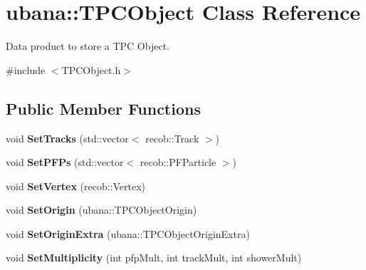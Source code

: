 \hypertarget{classubana_1_1TPCObject}{\section{ubana\-:\-:T\-P\-C\-Object Class Reference}
\label{classubana_1_1TPCObject}
}


Data product to store a T\-P\-C Object.  




{\ttfamily \#include $<$T\-P\-C\-Object.\-h$>$}

\subsection*{Public Member Functions}
\begin{DoxyCompactItemize}
\item 
\hypertarget{classubana_1_1TPCObject_a0766c8648ada3d539b474e40a107d8c1}{void {\bfseries Set\-Tracks} (std\-::vector$<$ recob\-::\-Track $>$)}\label{classubana_1_1TPCObject_a0766c8648ada3d539b474e40a107d8c1}

\item 
\hypertarget{classubana_1_1TPCObject_ab35b580187ad16cbd53325e8c776f655}{void {\bfseries Set\-P\-F\-Ps} (std\-::vector$<$ recob\-::\-P\-F\-Particle $>$)}\label{classubana_1_1TPCObject_ab35b580187ad16cbd53325e8c776f655}

\item 
\hypertarget{classubana_1_1TPCObject_a1fed8d9f87fc301a8cbee484a8434a05}{void {\bfseries Set\-Vertex} (recob\-::\-Vertex)}\label{classubana_1_1TPCObject_a1fed8d9f87fc301a8cbee484a8434a05}

\item 
\hypertarget{classubana_1_1TPCObject_ad4946cb455555486b701dd1301a26f56}{void {\bfseries Set\-Origin} (ubana\-::\-T\-P\-C\-Object\-Origin)}\label{classubana_1_1TPCObject_ad4946cb455555486b701dd1301a26f56}

\item 
\hypertarget{classubana_1_1TPCObject_a04af7a6b0627988b8ac2e2980f5bc181}{void {\bfseries Set\-Origin\-Extra} (ubana\-::\-T\-P\-C\-Object\-Origin\-Extra)}\label{classubana_1_1TPCObject_a04af7a6b0627988b8ac2e2980f5bc181}

\item 
\hypertarget{classubana_1_1TPCObject_aad67da2b0cd00fb82f8eb4d8f87bf18f}{void {\bfseries Set\-Multiplicity} (int pfp\-Mult, int track\-Mult, int shower\-Mult)}\label{classubana_1_1TPCObject_aad67da2b0cd00fb82f8eb4d8f87bf18f}


\end{DoxyCompactItemize}
